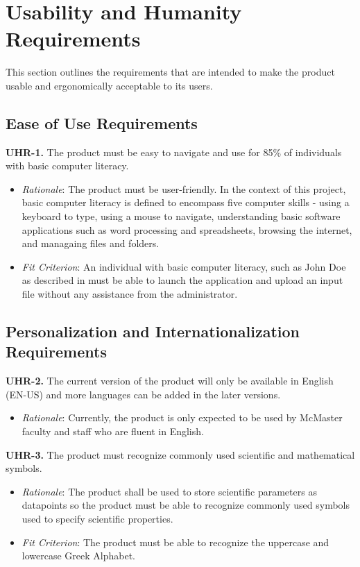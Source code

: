 \documentclass[12pt]{article}
\begin{document}
\section{Usability and Humanity Requirements}
This section outlines the requirements that are intended to make the product usable and ergonomically acceptable to its users.
\subsection{Ease of Use Requirements}
\textbf{UHR-1.} The product must be easy to navigate and use for 85\% of individuals with basic computer literacy.
\begin{itemize}
  \item \emph{Rationale}: The product must be user-friendly. In the context of this project, basic computer literacy is defined to encompass five computer skills - using a keyboard
  to type, using a mouse to navigate, understanding basic software applications such as word processing and spreadsheets, browsing the internet, and managaing files and folders.
  \item \emph{Fit Criterion}: An individual with basic computer literacy, such as John Doe as described in  must be able to launch the application and upload an input file
  without any assistance from the administrator.
\end{itemize}

\subsection{Personalization and Internationalization Requirements}
\textbf{UHR-2.} The current version of the product will only be available in English (EN-US) and more languages can be added in the later versions.
\begin{itemize}
  \item \emph{Rationale}: Currently, the product is only expected to be used by McMaster faculty and staff who are fluent in English.
\end{itemize}
\bigskip
\textbf{UHR-3.} The product must recognize commonly used scientific and mathematical symbols.
\begin{itemize}
  \item \emph{Rationale}: The product shall be used to store scientific parameters as datapoints so the product must be able to recognize commonly used symbols used to specify scientific properties.
  \item \emph{Fit Criterion}: The product must be able to recognize the uppercase and lowercase Greek Alphabet.
\end{itemize}
\end{document}
